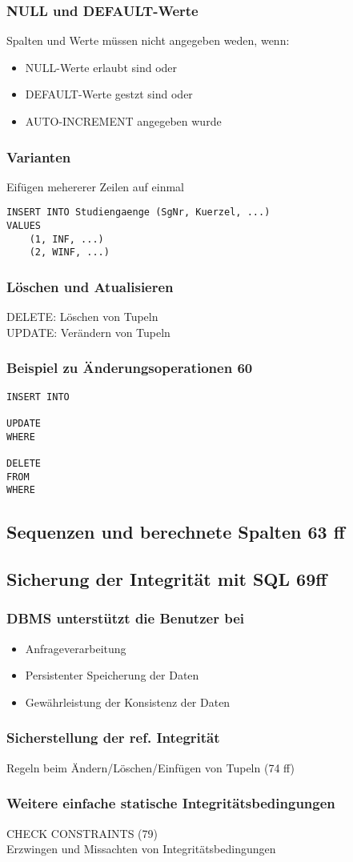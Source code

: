 \subsubsection{NULL und DEFAULT-Werte}
Spalten und Werte müssen nicht angegeben weden, wenn:
\begin{itemize}
	\item NULL-Werte erlaubt sind oder
	\item DEFAULT-Werte gestzt sind oder 
	\item AUTO-INCREMENT angegeben wurde
\end{itemize}
\subsubsection{Varianten}
Eifügen mehererer Zeilen auf einmal
\begin{lstlisting}
INSERT INTO Studiengaenge (SgNr, Kuerzel, ...)
VALUES 
	(1, INF, ...)
	(2, WINF, ...)
\end{lstlisting}
\subsubsection{Löschen und Atualisieren}
DELETE: Löschen von Tupeln\\
UPDATE: Verändern von Tupeln
\subsubsection{Beispiel zu Änderungsoperationen 60}
\begin{lstlisting}
INSERT INTO

UPDATE
WHERE

DELETE
FROM 
WHERE
\end{lstlisting}
\subsection{Sequenzen und berechnete Spalten 63 ff}
\subsection{Sicherung der Integrität mit SQL 69ff}
\subsubsection{DBMS unterstützt die Benutzer bei}
\begin{itemize}
	\item Anfrageverarbeitung
	\item Persistenter Speicherung der Daten
	\item Gewährleistung der Konsistenz der Daten
\end{itemize}
\subsubsection{Sicherstellung der ref. Integrität}
Regeln beim Ändern/Löschen/Einfügen von Tupeln (74 ff)
\subsubsection{Weitere einfache statische Integritätsbedingungen}
CHECK CONSTRAINTS (79)\\
Erzwingen und Missachten von Integritätsbedingungen